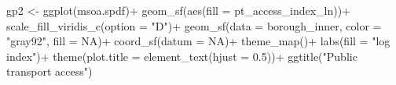 \documentclass[
  letterpaper,
]{scrbook}
\newenvironment{Shaded}{\begin{snugshade}}{\end{snugshade}}
\newcommand{\AttributeTok}[1]{\textcolor[rgb]{0.40,0.45,0.13}{#1}}
\newcommand{\ConstantTok}[1]{\textcolor[rgb]{0.56,0.35,0.01}{#1}}
\newcommand{\FloatTok}[1]{\textcolor[rgb]{0.68,0.00,0.00}{#1}}
\newcommand{\FunctionTok}[1]{\textcolor[rgb]{0.28,0.35,0.67}{#1}}
\newcommand{\NormalTok}[1]{\textcolor[rgb]{0.00,0.23,0.31}{#1}}
\newcommand{\OtherTok}[1]{\textcolor[rgb]{0.00,0.23,0.31}{#1}}
\newcommand{\SpecialCharTok}[1]{\textcolor[rgb]{0.37,0.37,0.37}{#1}}
\newcommand{\StringTok}[1]{\textcolor[rgb]{0.13,0.47,0.30}{#1}}
\begin{document}
\begin{Shaded}
\begin{Highlighting}[]
\NormalTok{gp2 }\OtherTok{\textless{}{-}} \FunctionTok{ggplot}\NormalTok{(msoa.spdf)}\SpecialCharTok{+}
  \FunctionTok{geom\_sf}\NormalTok{(}\FunctionTok{aes}\NormalTok{(}\AttributeTok{fill =}\NormalTok{ pt\_access\_index\_ln))}\SpecialCharTok{+}
  \FunctionTok{scale\_fill\_viridis\_c}\NormalTok{(}\AttributeTok{option =} \StringTok{"D"}\NormalTok{)}\SpecialCharTok{+}
  \FunctionTok{geom\_sf}\NormalTok{(}\AttributeTok{data =}\NormalTok{ borough\_inner, }\AttributeTok{color =} \StringTok{"gray92"}\NormalTok{, }\AttributeTok{fill =} \ConstantTok{NA}\NormalTok{)}\SpecialCharTok{+}
  \FunctionTok{coord\_sf}\NormalTok{(}\AttributeTok{datum =} \ConstantTok{NA}\NormalTok{)}\SpecialCharTok{+}
  \FunctionTok{theme\_map}\NormalTok{()}\SpecialCharTok{+}
  \FunctionTok{labs}\NormalTok{(}\AttributeTok{fill =} \StringTok{"log index"}\NormalTok{)}\SpecialCharTok{+}
  \FunctionTok{theme}\NormalTok{(}\AttributeTok{plot.title =} \FunctionTok{element\_text}\NormalTok{(}\AttributeTok{hjust =} \FloatTok{0.5}\NormalTok{))}\SpecialCharTok{+}
  \FunctionTok{ggtitle}\NormalTok{(}\StringTok{"Public transport access"}\NormalTok{)}
\end{Highlighting}
\end{Shaded}
\end{document}
